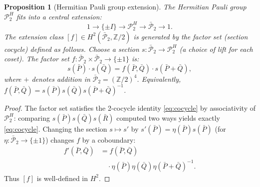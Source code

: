 \documentclass[11pt]{article}
\newtheorem{proposition}[theorem]{Proposition}
\begin{document}
\begin{proposition}[Hermitian Pauli group extension]
\label{prop:pauli-ext}
The Hermitian Pauli group $\mathcal{P}_2^H$ fits into a central extension:
\begin{equation}
\label{eq:pauli-ext}
  1 \longrightarrow \{\pm I\} \longrightarrow \mathcal{P}_2^H
  \longrightarrow \bar{\mathcal{P}}_2 \longrightarrow 1.
\end{equation}
The extension class $[f] \in H^2(\bar{\mathcal{P}}_2, \mathbb{Z}/2)$
is generated by the \emph{factor set} (section cocycle) defined as follows.
Choose a section $s: \bar{\mathcal{P}}_2 \to \mathcal{P}_2^H$ (a choice of
lift for each coset). The factor set $f: \bar{\mathcal{P}}_2 \times \bar{\mathcal{P}}_2 \to \{\pm 1\}$ is:
\begin{equation}
\label{eq:factor-set}
  s(\bar{P}) \cdot s(\bar{Q}) = f(\bar{P}, \bar{Q}) \cdot s(\bar{P} + \bar{Q}),
\end{equation}
where $+$ denotes addition in $\bar{\mathcal{P}}_2 = (\mathbb{Z}/2)^4$.
Equivalently, $f(\bar{P}, \bar{Q}) = s(\bar{P})s(\bar{Q})s(\bar{P}+\bar{Q})^{-1}$.
\end{proposition}

\begin{proof}
The factor set satisfies the 2-cocycle identity \eqref{eq:cocycle}
by associativity of $\mathcal{P}_2^H$: comparing
$s(\bar{P})s(\bar{Q})s(\bar{R})$ computed two ways yields exactly
\eqref{eq:cocycle}.\linebreak
Changing the section $s \mapsto s'$ by $s'(\bar{P}) = \eta(\bar{P})s(\bar{P})$
(for $\eta: \bar{\mathcal{P}}_2 \to \{\pm 1\}$) changes $f$ by a coboundary:
\[
\begin{split}
f'(\bar{P},\bar{Q}) &= f(\bar{P},\bar{Q}) \\
&\quad \cdot \eta(\bar{P})\eta(\bar{Q})\eta(\bar{P}+\bar{Q})^{-1}.
\end{split}
\]
Thus $[f]$ is well-defined in $H^2$.
\end{proof}
\end{document}
